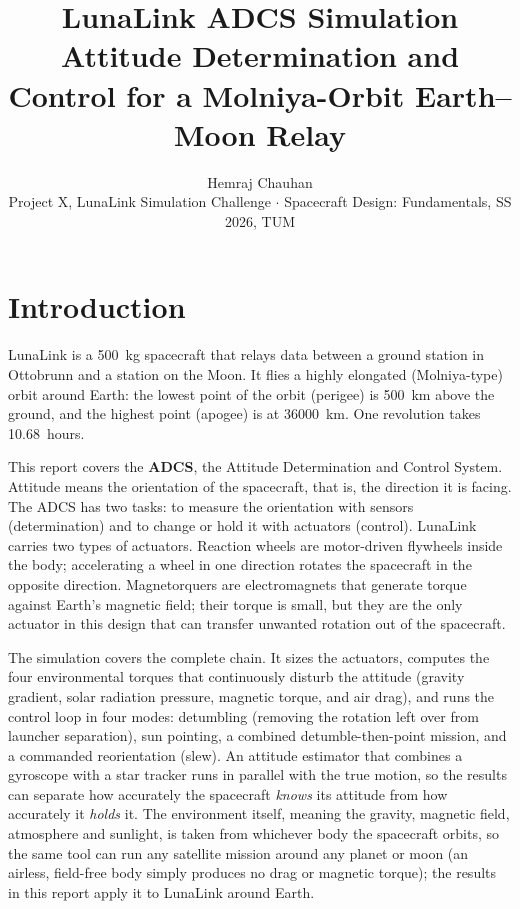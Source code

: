\documentclass[11pt,a4paper]{article}
\title{\vspace{-1.2cm}\textbf{LunaLink ADCS Simulation}\\[2pt]
\large Attitude Determination and Control for a Molniya-Orbit Earth--Moon Relay}
\author{Hemraj Chauhan\\
\small Project X, LunaLink Simulation Challenge \(\cdot\)
Spacecraft Design: Fundamentals, SS 2026, TUM}
\date{}
\begin{document}
\maketitle
\vspace{-0.9cm}

\section{Introduction}

LunaLink is a \SI{500}{kg} spacecraft that relays data between a ground
station in Ottobrunn and a station on the Moon. It flies a highly
elongated (Molniya-type) orbit around Earth: the lowest point of the
orbit (perigee) is \SI{500}{km} above the ground, and the highest point
(apogee) is at \SI{36000}{km}. One revolution takes \SI{10.68}{hours}.

This report covers the \textbf{ADCS}, the Attitude Determination and
Control System. Attitude means the orientation of the spacecraft, that
is, the direction it is facing. The ADCS has two tasks: to measure the
orientation with sensors (determination) and to change or hold it with
actuators (control). LunaLink carries two types of actuators. Reaction
wheels are motor-driven flywheels inside the body; accelerating a wheel
in one direction rotates the spacecraft in the opposite direction.
Magnetorquers are electromagnets that generate torque against Earth's
magnetic field; their torque is small, but they are the only actuator in
this design that can transfer unwanted rotation out of the spacecraft.

The simulation covers the complete chain. It sizes the actuators,
computes the four environmental torques that continuously disturb the
attitude (gravity gradient, solar radiation pressure, magnetic torque,
and air drag), and runs the control loop in four modes: detumbling
(removing the rotation left over from launcher separation), sun pointing,
a combined detumble-then-point mission, and a commanded reorientation
(slew). An attitude estimator that combines a gyroscope with a star
tracker runs in parallel with the true motion, so the results can
separate how accurately the spacecraft \emph{knows} its attitude from how
accurately it \emph{holds} it. The environment itself, meaning the
gravity, magnetic field, atmosphere and sunlight, is taken from whichever
body the spacecraft orbits, so the same tool can run any satellite mission
around any planet or moon (an airless, field-free body simply produces no
drag or magnetic torque); the results in this report apply it to LunaLink
around Earth.
\end{document}
